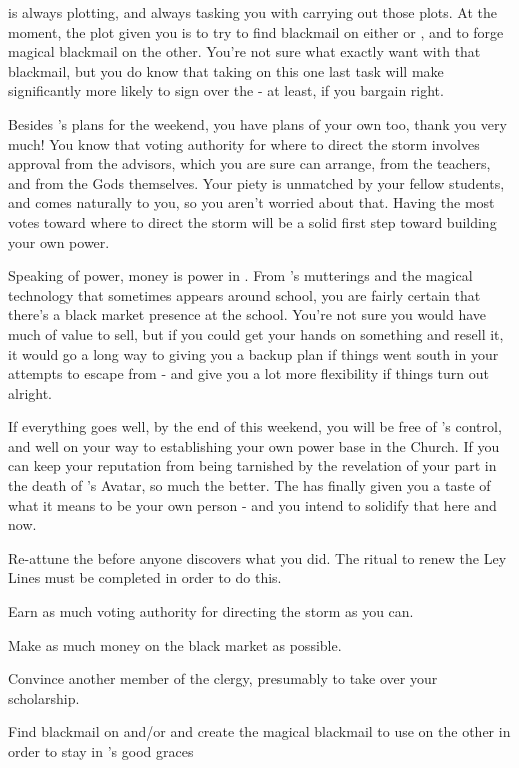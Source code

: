 \documentclass[char]{GL2020}
\begin{document}
\cAntiChup{} is always plotting, and always tasking you with carrying out those plots. At the moment, the plot \cAntiChup{\they} \cAntiChup{\have} given you is to try to find blackmail on either \cInitiate{} or \cPirate{}, and to forge magical blackmail on the other. You’re not sure what exactly \cAntiChup{\they} want\cAntiChup{\plural} with that blackmail, but you do know that taking on this one last task will make \cAntiChup{} significantly more likely to sign over the \iScholarship{} - at least, if you bargain right.

Besides \cAntiChup{}’s plans for the weekend, you have plans of your own too, thank you very much! You know that voting authority for where to direct the storm involves approval from the advisors, which you are sure \cAntiChup{} can arrange, from the teachers, and from the Gods themselves. Your piety is unmatched by your fellow students, and comes naturally to you, so you aren’t worried about that. Having the most votes toward where to direct the storm will be a solid first step toward building your own power.

Speaking of power, money is power in \pTech{}. From \cAntiChup{}’s mutterings and the magical technology that sometimes appears around school, you are fairly certain that there’s a black market presence at the school. You’re not sure you would have much of value to sell, but if you could get your hands on something and resell it, it would go a long way to giving you a backup plan if things went south in your attempts to escape from \cAntiChup{} - and give you a lot more flexibility if things turn out alright.

If everything goes well, by the end of this weekend, you will be free of \cAntiChup{}’s control, and well on your way to establishing your own power base in the Church. If you can keep your reputation from being tarnished by the revelation of your part in the death of \cEbb{}’s Avatar, so much the better. The \pSchool{} has finally given you a taste of what it means to be your own person - and you intend to solidify that here and now.

\begin{itemz}[Goals]
	\item Re-attune the \iNet{} before anyone discovers what you did. The ritual to renew the Ley Lines must be completed in order to do this.
	\item Earn as much voting authority for directing the storm as you can.
	\item Make as much money on the black market as possible.
	\item Convince another member of the \pTech{} clergy, presumably \cBeetle{} to take over your scholarship.
	\item Find blackmail on \cInitiate{} and/or \cPirate{} and create the magical blackmail to use on the other in order to stay in \cAntiChup{}’s good graces
\end{itemz}
\end{document}
